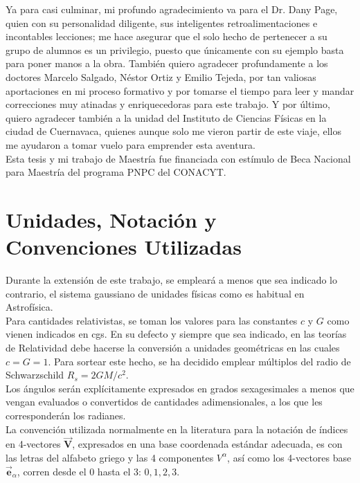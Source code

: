 \documentclass[letterpaper, twoside,openright]{book}
\begin{document}
Ya para casi culminar, mi profundo agradecimiento va para el Dr. Dany Page, quien con su personalidad diligente, sus inteligentes retroalimentaciones e incontables lecciones; me hace asegurar que el solo hecho de pertenecer a su grupo de alumnos es un privilegio, puesto que únicamente con su ejemplo basta para poner manos a la obra. También quiero agradecer profundamente a los doctores Marcelo Salgado, Néstor Ortiz y Emilio Tejeda, por tan valiosas aportaciones en mi proceso formativo y por tomarse el tiempo para leer y mandar correcciones muy atinadas y enriquecedoras para este trabajo. Y por último, quiero agradecer también a la unidad del Instituto de Ciencias Físicas en la ciudad de Cuernavaca, quienes aunque solo me vieron partir de este viaje, ellos me ayudaron a tomar vuelo para emprender esta aventura.\\

Esta tesis y mi trabajo de Maestría fue financiada con estímulo de Beca Nacional para Maestría del programa PNPC del CONACYT.

\thispagestyle{empty}

\newpage

\thispagestyle{empty}

\newpage

\section*{Unidades, Notación y Convenciones Utilizadas}

Durante la extensión de este trabajo, se empleará a menos que sea indicado lo contrario, el sistema gaussiano de unidades físicas como es habitual en Astrofísica.\\

Para cantidades relativistas, se toman los valores para las constantes $c$ y $G$ como vienen indicados en cgs. En su defecto y siempre que sea indicado, en las teorías de Relatividad debe hacerse la conversión a unidades geométricas en las cuales $c=G=1$. Para sortear este hecho, se ha decidido emplear múltiplos del radio de Schwarzschild $R_s=2GM/c^2$.\\

Los ángulos serán explícitamente expresados en grados sexagesimales a menos que vengan evaluados o convertidos de cantidades adimensionales, a los que les corresponderán los radianes.\\

La convención utilizada normalmente en la literatura para la notación de índices en 4-vectores $\vec{\mathbf{V}}$, expresados en una base coordenada estándar adecuada, es con las letras del 
alfabeto griego y las 4 componentes $V^\alpha$, así como los 4-vectores base $\vec{\mathbf{e}}_{\alpha}$, corren desde el 0 hasta el 3: $0, 1, 2, 3$.\\
\end{document}
